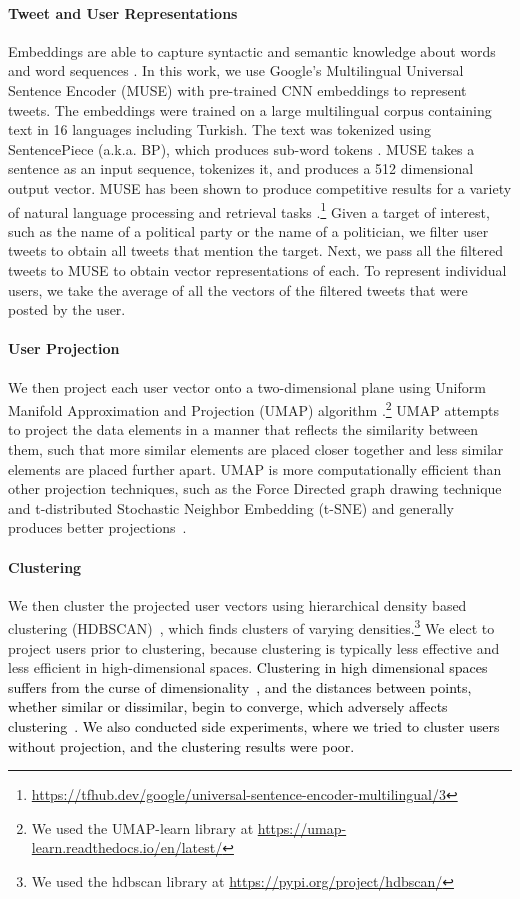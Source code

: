 \documentclass[letterpaper]{article} \usepackage{aaai20}  \usepackage{times}  \usepackage{stackengine}
\newcommand{\kareem}{\textcolor{black}}
\begin{document}
\paragraph{Tweet and User Representations} Embeddings are able to capture syntactic and semantic knowledge about words and word sequences \citep{garg2018word}. In this work, we use Google's Multilingual Universal Sentence Encoder (MUSE) with pre-trained CNN embeddings \citep{yang2019multilingual} to represent tweets. The embeddings were trained on a large multilingual corpus containing text in 16 languages including Turkish. The text was tokenized using SentencePiece (a.k.a. BP), which produces sub-word tokens \citep{kudo2018sentencepiece}. MUSE takes a sentence as an input sequence, tokenizes it, and produces a 512 dimensional output vector. MUSE has been shown to produce competitive results for a variety of natural language processing and retrieval tasks \citep{yang2019multilingual}.\footnote{\url{https://tfhub.dev/google/universal-sentence-encoder-multilingual/3}}  
Given a target of interest, such as the name of a political party or the name of a politician, we filter user tweets to obtain all tweets that mention the target. Next, we pass all the filtered tweets to MUSE to obtain vector representations of each.  To represent individual users, we take the average of all the vectors of the filtered tweets that were posted by the user. 
\paragraph{User Projection} We then project each user vector onto a two-dimensional plane using Uniform Manifold Approximation and Projection (UMAP) algorithm \citep{mcinnes2018umap}.\footnote{We used the UMAP-learn library at \url{https://umap-learn.readthedocs.io/en/latest/}} UMAP attempts to project the data elements in a manner that reflects the similarity between them, such that more similar elements are placed closer together and less similar elements are placed further apart. UMAP is more computationally efficient than other projection techniques, such as the Force Directed graph drawing technique \citep{fruchterman1991graph} and t-distributed Stochastic Neighbor Embedding (t-SNE) \citep{maaten2008visualizing} and generally produces better projections~\citep{mcinnes2018umap}. 
\paragraph{Clustering} We then cluster the projected user vectors using hierarchical density based clustering (HDBSCAN)~\citep{mcinnes2017accelerated}, which finds clusters of varying densities.\footnote{We used the hdbscan library at \url{https://pypi.org/project/hdbscan/}} We elect to project users prior to clustering, because clustering is typically less effective and less efficient in high-dimensional spaces. \kareem{Clustering in high dimensional spaces suffers from the curse of dimensionality~\citep{VerleysenCurseDim2003}, and the distances between points, whether similar or dissimilar, begin to converge, which adversely affects clustering~\citep{beyer1999when}. We also conducted side experiments, where we tried to cluster users without projection, and the clustering results were poor. }
\end{document}

